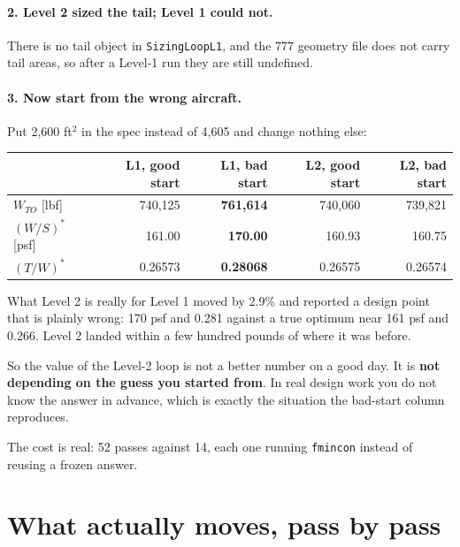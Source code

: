 \documentclass[11pt, a4paper]{article}
\begin{document}
\paragraph{2. Level 2 sized the tail; Level 1 could not.} There is no tail
object in \texttt{SizingLoopL1}, and the 777 geometry file does not carry tail
areas, so after a Level-1 run they are still undefined.

\paragraph{3. Now start from the wrong aircraft.} Put 2{,}600 ft$^2$ in the
spec instead of 4{,}605 and change nothing else:

\begin{center}
\footnotesize
\begin{tabular}{@{}lrrrr@{}}
\toprule
& L1, good start & L1, \textbf{bad start} & L2, good start & L2, \textbf{bad start} \\
\midrule
$W_{TO}$ [lbf]  & 740{,}125 & \textbf{761{,}614} & 740{,}060 & 739{,}821 \\
$(W/S)^*$ [psf] & 161.00    & \textbf{170.00}    & 160.93    & 160.75 \\
$(T/W)^*$       & 0.26573   & \textbf{0.28068}   & 0.26575   & 0.26574 \\
\bottomrule
\end{tabular}
\end{center}

\begin{keybox}{What Level 2 is really for}
Level 1 moved by 2.9\% and reported a design point that is plainly wrong: 170
psf and 0.281 against a true optimum near 161 psf and 0.266. Level 2 landed
within a few hundred pounds of where it was before.

So the value of the Level-2 loop is not a better number on a good day. It is
\textbf{not depending on the guess you started from}. In real design work you
do not know the answer in advance, which is exactly the situation the bad-start
column reproduces.

The cost is real: 52 passes against 14, each one running \texttt{fmincon}
instead of reusing a frozen answer.
\end{keybox}

\clearpage

\section{What actually moves, pass by pass}
\label{sec:trace}
\end{document}
